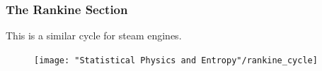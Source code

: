 \documentclass[british]{article}
\begin{document}
\subsubsection{The Rankine Section}
This is a similar cycle for steam engines.
\begin{figure}[h]
	\begin{center}
		\texttt{[image: "Statistical Physics and Entropy"/rankine\_cycle]}
	\end{center}
\end{figure}






 
\end{document}
